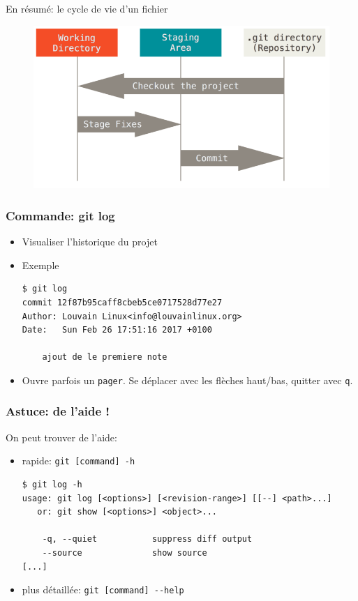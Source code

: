\documentclass{beamer}
\begin{document}
\begin{frame}{En résumé: le cycle de vie d'un fichier}
\begin{figure}
    \centering
    \includegraphics[width=\textwidth]{img/areas.png}
\end{figure}
\end{frame}

\begin{frame}[fragile]
\frametitle{Commande: git log}

\begin{itemize}
    \item Visualiser l'historique du projet
    \item Exemple
\begin{lstlisting}
$ git log
commit 12f87b95caff8cbeb5ce0717528d77e27
Author: Louvain Linux<info@louvainlinux.org>
Date:   Sun Feb 26 17:51:16 2017 +0100

    ajout de le premiere note
\end{lstlisting}
    \item Ouvre parfois un \texttt{pager}. Se déplacer avec les flèches haut/bas, quitter avec \texttt{q}.
\end{itemize}
\end{frame}

\begin{frame}[fragile]
    \frametitle{Astuce: de l'aide !}
    On peut trouver de l'aide:
    \begin{itemize}
        \item rapide: \texttt{git [command] -h}
\begin{lstlisting}
$ git log -h
usage: git log [<options>] [<revision-range>] [[--] <path>...]
   or: git show [<options>] <object>...

    -q, --quiet           suppress diff output
    --source              show source
[...]
\end{lstlisting}
        \item plus détaillée: \lstinline{git [command] --help}
    \end{itemize}
\end{frame}
\end{document}
